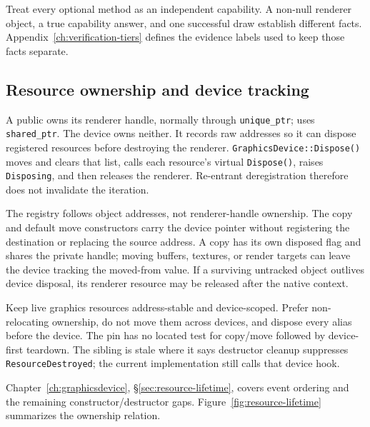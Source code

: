 \begin{contractnote}
Treat every optional method as an independent capability. A non-null renderer object, a true
capability answer, and one successful draw establish different facts. Appendix~\ref{ch:verification-tiers}
defines the evidence labels used to keep those facts separate.
\end{contractnote}

\subsection{Resource ownership and device tracking}
\label{sec:backend-resource-tracking}

A public  owns its renderer handle, normally through
\texttt{unique\_ptr};  uses \texttt{shared\_ptr}. The device owns neither.
It records raw  addresses so it can dispose registered resources
before destroying the renderer. \texttt{GraphicsDevice::Dispose()} moves and clears that list,
calls each resource's virtual \texttt{Dispose()}, raises \texttt{Disposing}, and then releases
the renderer. Re-entrant deregistration therefore does not invalidate the iteration.

The registry follows object addresses, not renderer-handle ownership. The
 copy and default move constructors carry the device pointer without
registering the destination or replacing the source address. A  copy has its
own disposed flag and shares the private handle; moving buffers, textures, or render targets can
leave the device tracking the moved-from value. If a surviving untracked object outlives device
disposal, its renderer resource may be released after the native context.

\begin{limitationnote}
Keep live graphics resources address-stable and device-scoped. Prefer non-relocating ownership,
do not move them across devices, and dispose every  alias before the device.
The pin has no located test for copy/move followed by device-first teardown. The sibling
 is stale where it says destructor cleanup suppresses
\texttt{ResourceDestroyed}; the current implementation still calls that device hook.
\end{limitationnote}

Chapter~\ref{ch:graphicsdevice}, \S\ref{sec:resource-lifetime}, covers event ordering and the
remaining constructor/destructor gaps. Figure~\ref{fig:resource-lifetime} summarizes the
ownership relation.

